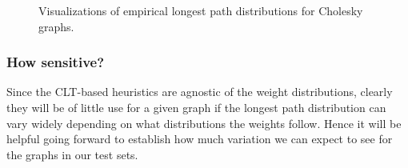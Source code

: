 \documentclass[12pt]{article}
\begin{document}
      \begin{figure}
	\centering	
	\caption{Visualizations of empirical longest path distributions for Cholesky graphs.}	
	\label{plot.emp_hists} 
      \end{figure}

      \subsubsection{How sensitive?}
      \label{subsubsect.sensitive}

      Since the CLT-based heuristics are agnostic of the weight distributions, clearly they will be of little use for a given graph if the longest path distribution can vary widely depending on what distributions the weights follow. Hence it will be helpful going forward to establish how much variation we can expect to see for the graphs in our test sets.
\end{document}
